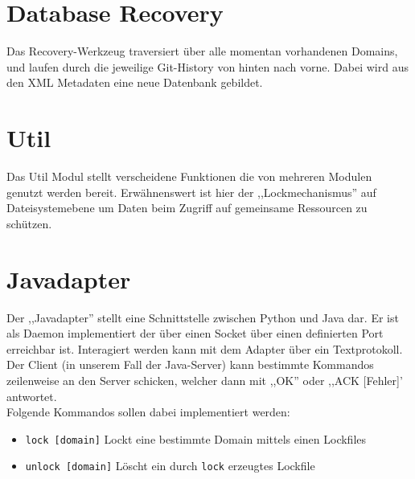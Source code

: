 \section{Database Recovery} 
\label{sec:database_recovery}
Das Recovery-Werkzeug traversiert über alle momentan vorhandenen Domains, und laufen durch die
jeweilige Git-History von hinten nach vorne. Dabei wird aus den XML Metadaten eine neue Datenbank gebildet.

\section{Util} 
\label{sec:util}
Das Util Modul stellt verscheidene Funktionen die von mehreren Modulen genutzt werden bereit. Erwähnenswert ist hier der ,,Lockmechanismus''
auf Dateisystemebene um Daten beim Zugriff auf gemeinsame  Ressourcen zu schützen.

\section{Javadapter} 
\label{sec:javadapter}
Der ,,Javadapter'' stellt eine Schnittstelle zwischen Python und Java dar. Er ist als Daemon implementiert der über einen Socket über einen definierten Port
erreichbar ist. Interagiert werden kann mit dem Adapter über ein Textprotokoll. Der Client (in unserem Fall der Java-Server) kann bestimmte Kommandos
zeilenweise an den Server schicken, welcher dann mit ,,OK'' oder ,,ACK [Fehler]' antwortet.
\\
Folgende Kommandos sollen dabei implementiert werden:
\begin{itemize}
    \item \texttt{lock [domain]}
        Lockt eine bestimmte Domain mittels einen Lockfiles
    \item \texttt{unlock [domain]}
        Löscht ein durch \texttt{lock} erzeugtes Lockfile
\end{itemize}
